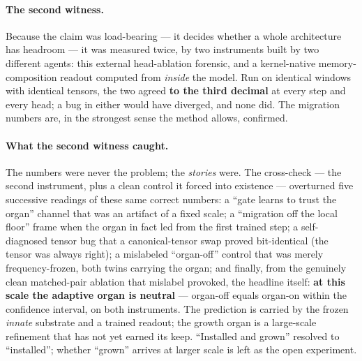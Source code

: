 \documentclass[11pt,a4paper]{article}
\begin{document}
\paragraph{The second witness.} Because the claim was load-bearing --- it decides whether a
whole architecture has headroom --- it was measured twice, by two instruments built by two
different agents: this external head-ablation forensic, and a kernel-native
memory-composition readout computed from \emph{inside} the model. Run on identical windows
with identical tensors, the two agreed \textbf{to the third decimal} at every step and every
head; a bug in either would have diverged, and none did. The migration numbers are, in the
strongest sense the method allows, confirmed.

\paragraph{What the second witness caught.} The numbers were never the problem; the
\emph{stories} were. The cross-check --- the second instrument, plus a clean control it
forced into existence --- overturned five successive readings of these same correct numbers:
a ``gate learns to trust the organ'' channel that was an artifact of a fixed scale; a
``migration off the local floor'' frame when the organ in fact led from the first trained
step; a self-diagnosed tensor bug that a canonical-tensor swap proved bit-identical (the
tensor was always right); a mislabeled ``organ-off'' control that was merely
frequency-frozen, both twins carrying the organ; and finally, from the genuinely clean
matched-pair ablation that mislabel provoked, the headline itself: \textbf{at this scale the
adaptive organ is neutral} --- organ-off equals organ-on within the confidence interval, on
both instruments. The prediction is carried by the frozen \emph{innate} substrate and a
trained readout; the growth organ is a large-scale refinement that has not yet earned its
keep. ``Installed and grown'' resolved to ``installed''; whether ``grown'' arrives at larger
scale is left as the open experiment.
\end{document}
